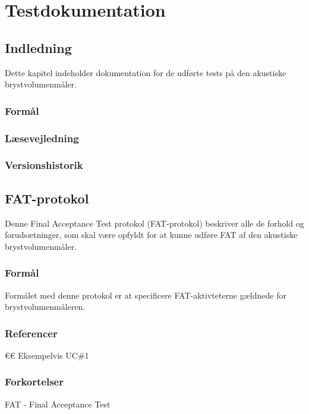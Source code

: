 
\chapter{Testdokumentation}
	\section{Indledning}
	Dette kapitel indeholder dokumentation for de udførte tests på den akustiske brystvolumenmåler. 
		  
		\subsection{Formål}
		
	
		\subsection{Læsevejledning}	
		
				
		\subsection{Versionshistorik}
		
		\vspace{5mm}
		
			\begin{figure}[htb]
				
			\end{figure}
			
			
	\section{FAT-protokol}
	Denne Final Acceptance Test protokol (FAT-protokol) beskriver alle de forhold og forudsætninger, som skal være opfyldt for at kunne udføre FAT af den akustiske brystvolumenmåler. 
	  
		\subsection{Formål}
		Formålet med denne protokol er at specificere FAT-aktivteterne gældnede for brystvolumenmåleren. 
		
		\subsection{Referencer}
		€€ Eksempelvis UC\#1
		
		\subsection{Forkortelser}
		FAT - Final Acceptance Test
		  
